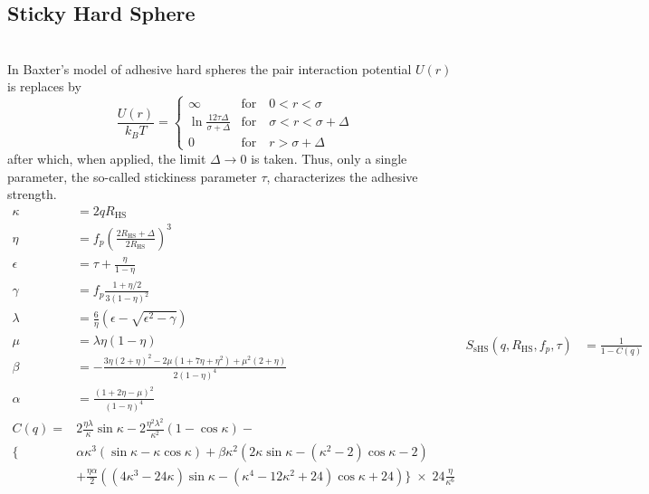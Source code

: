 
\clearpage
\subsection{Sticky Hard Sphere} ~\\

In Baxter's model \cite{Baxter1968,Robertus1989,Kruif1989,Barboy1974,Menon1991,Menon1991a}
of adhesive hard spheres the pair interaction potential $U(r)$ is replaces by
\begin{equation}
\frac{U(r)}{k_BT} =
 \begin{cases}
      \infty    & \text{for} \quad 0<r<\sigma \\
      \ln\frac{12\tau\Delta}{\sigma+\Delta} & \text{for} \quad \sigma<r<\sigma+\Delta \\
      0         & \text{for} \quad r>\sigma+\Delta
   \end{cases}
\end{equation}
after which, when applied, the limit $\Delta \to 0$ is taken.
Thus, only a single parameter, the so-called stickiness parameter
$\tau$, characterizes the adhesive strength.
\begin{subequations}
\begin{align}
\kappa &= 2 q R_\text{HS} \\
\eta &= f_p \left(\frac{2R_\text{HS}+\Delta}{2R_\text{HS}}\right)^3\\
\epsilon &= \tau+\frac{\eta}{1-\eta} \\
\gamma &= f_p\frac{1+\eta/2}{3\left(1-\eta\right)^2} \\
\lambda &= \frac{6}{\eta} \left(\epsilon-\sqrt{\epsilon^2-\gamma}\right)\\
\mu &= \lambda \eta (1-\eta) \\
\beta &= -\frac{3\eta \left(2+\eta\right)^2-2\mu \left(1+7\eta+\eta^2\right)+\mu^2(2+\eta)}{2\left(1-\eta\right)^4}\\
\alpha &= \frac{\left(1+2\eta-\mu\right)^2}{\left(1-\eta\right)^4}\\[5mm]
C(q) = & 2\frac{\eta\lambda}{\kappa}\sin\kappa
        -2\frac{\eta^2\lambda^2}{\kappa^2}\left(1-\cos\kappa\right) -\\
   \Big\{ & \alpha\kappa^3(\sin\kappa-\kappa\cos\kappa)
           +\beta\kappa^2(2\kappa\sin\kappa-(\kappa^2-2)\cos\kappa-2)\nonumber\\
          & +\frac{\eta\alpha}{2}\left((4\kappa^3-24\kappa)\sin\kappa-(\kappa^4-12\kappa^2+24)\cos\kappa+24\right)
             \Big\} \;\times\;24\frac{\eta}{\kappa^6}\nonumber
\end{align}
\begin{align}
   S_\text{sHS}(q,R_\text{HS},f_p,\tau) & = \frac{1}{1-C(q)}
\end{align}
\end{subequations}



